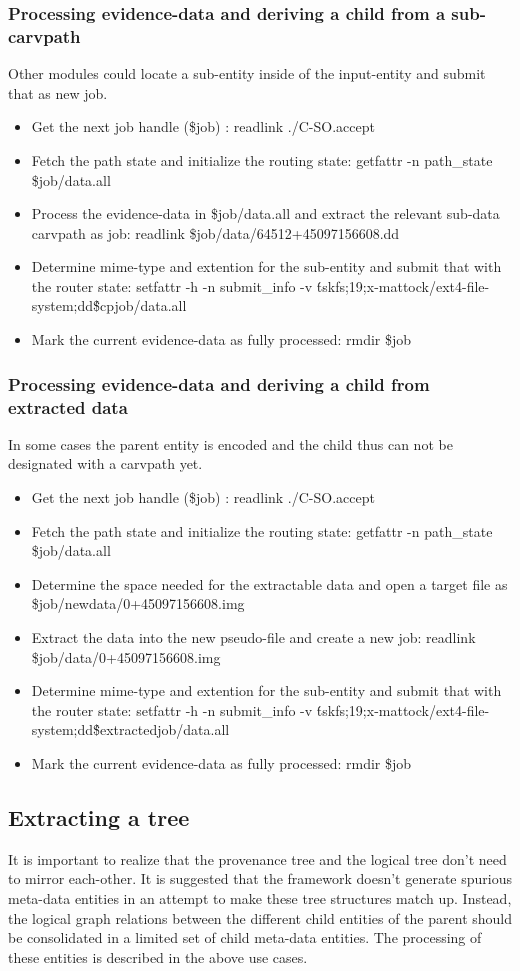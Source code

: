 \subsubsection{Processing evidence-data and deriving a child from a sub-carvpath}
Other modules could locate a sub-entity inside of the input-entity and submit that as new job.
\begin{itemize}
\item Get the next job handle (\$job) : readlink \@./C-SO.accept
\item Fetch the path state and initialize the routing state: getfattr -n path\_state \$job/data.all
\item Process the evidence-data in \$job/data.all and extract the relevant sub-data carvpath as job: readlink \$job/data/64512+45097156608.dd
\item Determine mime-type and extention for the sub-entity and submit that with the router state: setfattr -h -n submit\_info -v \'tskfs;19;x-mattock/ext4-file-system;dd\' \$cpjob/data.all
\item Mark the current evidence-data as fully processed: rmdir \$job
\end{itemize}
\subsubsection{Processing evidence-data and deriving a child from extracted data}
In some cases the parent entity is encoded and the child thus can not be designated with a carvpath yet.
\begin{itemize}
\item Get the next job handle (\$job) : readlink \@./C-SO.accept
\item Fetch the path state and initialize the routing state: getfattr -n path\_state \$job/data.all
\item Determine the space needed for the extractable data and open a target file as \$job/newdata/0+45097156608.img
\item Extract the data into the new pseudo-file and create a new job: readlink \$job/data/0+45097156608.img
\item Determine mime-type and extention for the sub-entity and submit that with the router state: setfattr -h -n submit\_info -v \'tskfs;19;x-mattock/ext4-file-system;dd\' \$extractedjob/data.all
\item Mark the current evidence-data as fully processed: rmdir \$job
\end{itemize}
\subsection{Extracting a tree}
It is important to realize that the provenance tree and the logical tree don't need to mirror each-other. It is suggested that the framework doesn't generate spurious meta-data entities in an attempt to make these tree structures match up. Instead, the logical graph relations between the different child entities of the parent should be consolidated in a limited set of child meta-data entities. The processing of these entities is described in the above use cases.
